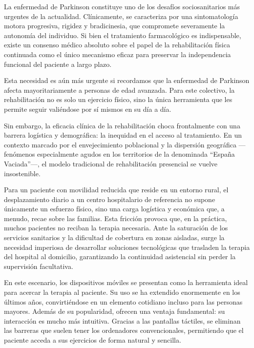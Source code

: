 
La enfermedad de Parkinson constituye uno de los desafíos sociosanitarios más urgentes de la actualidad. Clínicamente, se caracteriza por una sintomatología motora progresiva, rigidez y bradicinesia, que compromete severamente la autonomía del individuo. Si bien el tratamiento farmacológico es indispensable, existe un consenso médico absoluto sobre el papel de la rehabilitación física continuada como el único mecanismo eficaz para preservar la independencia funcional del paciente a largo plazo.

Esta necesidad es aún más urgente si recordamos que la enfermedad de Parkinson afecta mayoritariamente a personas de edad avanzada. Para este colectivo, la rehabilitación no es solo un ejercicio físico, sino la única herramienta que les permite seguir valiéndose por sí mismos en su día a día.

Sin embargo, la eficacia clínica de la rehabilitación choca frontalmente con una barrera logística y demográfica: la inequidad en el acceso al tratamiento. En un contexto marcado por el envejecimiento poblacional y la dispersión geográfica —fenómenos especialmente agudos en los territorios de la denominada ``España Vaciada''—, el modelo tradicional de rehabilitación presencial se vuelve insostenible.

Para un paciente con movilidad reducida que reside en un entorno rural, el desplazamiento diario a un centro hospitalario de referencia no supone únicamente un esfuerzo físico, sino una carga logística y económica que, a menudo, recae sobre las familias. Esta fricción provoca que, en la práctica, muchos pacientes no reciban la terapia necesaria. Ante la saturación de los servicios sanitarios y la dificultad de cobertura en zonas aisladas, surge la necesidad imperiosa de desarrollar soluciones tecnológicas que trasladen la terapia del hospital al domicilio, garantizando la continuidad asistencial sin perder la supervisión facultativa.

En este escenario, los dispositivos móviles se presentan como la herramienta ideal para acercar la terapia al paciente. Su uso se ha extendido enormemente en los últimos años, convirtiéndose en un elemento cotidiano incluso para las personas mayores. Además de su popularidad, ofrecen una ventaja fundamental: su interacción es mucho más intuitiva. Gracias a las pantallas táctiles, se eliminan las barreras que suelen tener los ordenadores convencionales, permitiendo que el paciente acceda a sus ejercicios de forma natural y sencilla.

